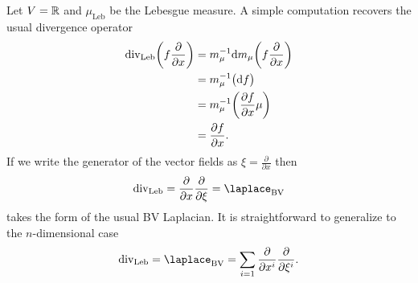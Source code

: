 \begin{example}
  Let $V = \mathbb{R}$ and $\mu_\text{Leb}$ be the Lebesgue measure. A simple computation recovers the usual divergence operator
  \begin{align*}
    \operatorname{div}_\text{Leb} \biggl( f \frac{\partial}{\partial  x} \biggr)
    &= m_\mu^{-1} \mathrm{d} m_\mu \biggl( f \frac{\partial}{\partial x} \biggr) \\
    &= m_\mu^{-1} \bigl( \mathrm{d} f\bigr) \\
    &= m_\mu^{-1} \biggl( \frac{\partial f}{\partial x} \mu \biggr) \\
    &= \frac{\partial f}{\partial x}.
  \end{align*}
  If we write the generator of the vector fields as $\xi = \frac{\partial}{\partial x}$ then
  \begin{equation*}
    \divergence_\text{Leb} = \frac{\partial}{\partial x} \frac{\partial}{\partial \xi} = \laplace_{\text{BV}}
  \end{equation*}
  takes the form of the usual BV Laplacian.
  It is straightforward to generalize to the $n$-dimensional case
  \begin{equation*}
    \divergence_{\text{Leb}} = \laplace_{\text{BV}}
    = \sum_{i = 1} \frac{\partial}{\partial x^i} \frac{\partial}{\partial \xi^i}.
  \end{equation*}
\end{example}

